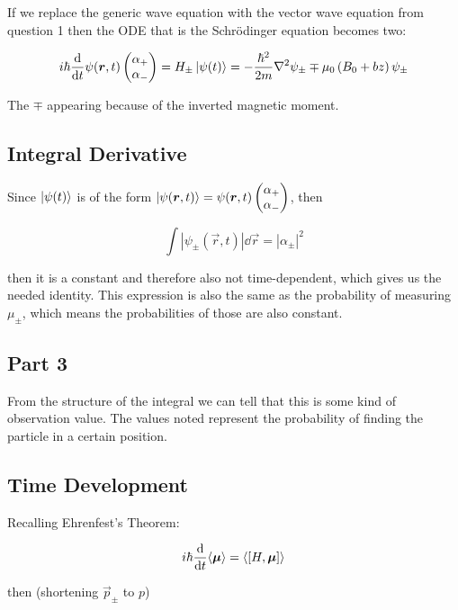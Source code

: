 If we replace the generic wave equation with the vector wave equation from question 1 then the ODE that is the Schrödinger equation becomes two:

\begin{equation}
	i\hbar \diff*{\psi(\vec r,t)\pmat{\alpha_+\\\alpha_-}}{t} = H_\pm\ket{\psi(t)} = -\frac{\hbar^2}{2m}\nabla^2\psi_\pm\mp\mu_0\ins{B_0+bz}\psi_\pm
\end{equation}

The $\mp$ appearing because of the inverted magnetic moment.

\subsection{Integral Derivative}

Since $\ket{\psi(t)}$ is of the form $\ket{\psi(\bm{r},t)}=\psi(\bm{r},t)\begin{pmatrix}\alpha_+\\\alpha_-\end{pmatrix}$, then 

\begin{equation}
	\int\left\lvert\psi_\pm(\vec r,t)\right\rvert\dd \vec r = \left\lvert\alpha_\pm\right\rvert^2
\end{equation}

then it is a constant and therefore also not time-dependent, which gives us the needed identity. This expression is also the same as the probability of measuring $\mu_\pm$, which means the probabilities of those are also constant.

\subsection{Part 3}

From the structure of the integral we can tell that this is some kind of observation value. The values noted represent the probability of finding the particle in a certain position.

\subsection{Time Development}

Recalling Ehrenfest's Theorem:

\begin{equation}
	i\hbar \diff*{\langle\vec\mu\rangle}{t} = \left\langle[H,\vec\mu]\right\rangle
\end{equation}

then (shortening $\vec p_\pm$ to $p$)

